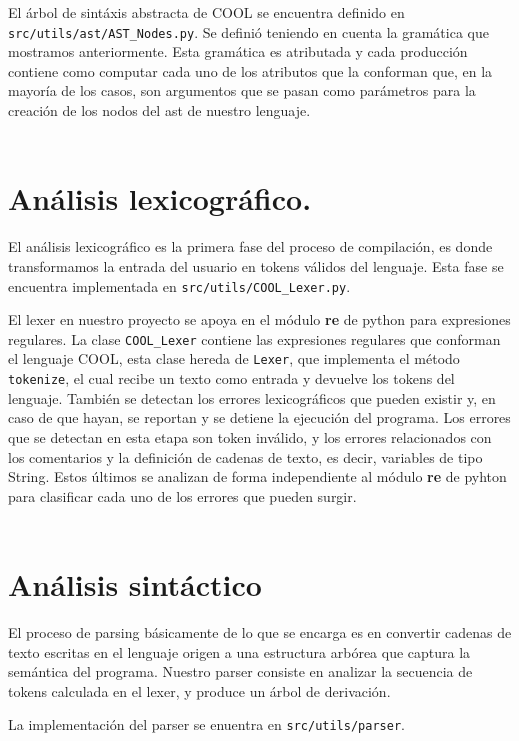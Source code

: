 \documentclass[twoside]{article}
\begin{document}
El \'arbol de sint\'axis abstracta de COOL se encuentra definido en \texttt{src/utils/ast/AST\_Nodes.py}. Se defini\'o teniendo en cuenta la gram\'atica que mostramos anteriormente. Esta gram\'atica es atributada y cada producci\'on contiene como computar cada uno de los atributos que la conforman que, en la mayor\'ia de los casos, son argumentos que se pasan como par\'ametros para la creaci\'on de los nodos del ast de nuestro lenguaje.\\\\


\section{An\'alisis lexicogr\'afico.}
El an\'alisis lexicogr\'afico es la primera fase del proceso de compilaci\'on, es donde transformamos la entrada del usuario en tokens v\'alidos del lenguaje. Esta fase se encuentra implementada en \texttt{src/utils/COOL\_Lexer.py}. 

El lexer en nuestro proyecto se apoya en el m\'odulo \textbf{re} de python para expresiones regulares. La clase \texttt{COOL\_Lexer} contiene las expresiones regulares que conforman el lenguaje COOL, esta clase hereda de \texttt{Lexer}, que implementa el m\'etodo \texttt{tokenize}, el cual recibe un texto como entrada y devuelve los tokens del lenguaje. Tambi\'en se detectan los errores lexicogr\'aficos que pueden existir y, en caso de que hayan, se reportan y se detiene la ejecuci\'on del programa. Los errores que se detectan en esta etapa son token inv\'alido, y los errores relacionados con los comentarios y la definici\'on de cadenas de texto, es decir, variables de tipo String. Estos \'ultimos se analizan de forma independiente al m\'odulo \textbf{re} de pyhton para clasificar cada uno de los errores que pueden surgir.\\\\


\section{An\'alisis sint\'actico}
El proceso de parsing b\'asicamente de lo que se encarga es en convertir cadenas de texto escritas en el lenguaje origen a una estructura arb\'orea que captura la sem\'antica del programa. Nuestro parser consiste en analizar la secuencia de tokens calculada en el lexer, y produce un \'arbol de derivaci\'on. 

La implementaci\'on del parser se enuentra en \texttt{src/utils/parser}. 
\end{document}
